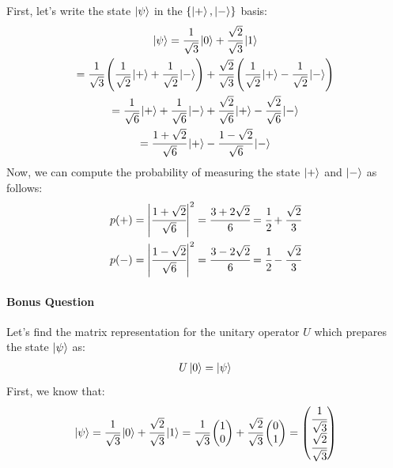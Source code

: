 \documentclass[12pt]{article}
\begin{document}
\begin{itemize}
First, let's write the state $\ket \psi$ in the $\{\ket +, \ket -\}$ basis:
\begin{gather*}
    \ket \psi = \cfrac{1}{\sqrt{3}} \ket 0 + \cfrac{\sqrt{2}}{\sqrt{3}} \ket 1 \\
    = \cfrac{1}{\sqrt{3}} \left(\cfrac{1}{\sqrt{2}}\ket + + \cfrac{1}{\sqrt{2}}\ket -\right) + 
    \cfrac{\sqrt{2}}{\sqrt{3}} \left(\cfrac{1}{\sqrt{2}} \ket + - \cfrac{1}{\sqrt{2}} \ket -\right) \\
    = \cfrac{1}{\sqrt{6}} \ket + + \cfrac{1}{\sqrt{6}} \ket - + 
    \cfrac{\sqrt{2}}{\sqrt{6}} \ket + - \cfrac{\sqrt{2}}{\sqrt{6}} \ket - \\
    = \cfrac{1+\sqrt{2}}{\sqrt{6}} \ket + - \cfrac{1-\sqrt{2}}{\sqrt{6}} \ket -
\end{gather*}
Now, we can compute the probability of measuring the state $\ket +$ and $\ket -$ as follows:
\begin{gather*}
    p(+) = \abs{\cfrac{1+\sqrt{2}}{\sqrt{6}}}^2 = \cfrac{3+2\sqrt{2}}{6} = \cfrac{1}{2} + \cfrac{\sqrt{2}}{3} \\
    p(-) = \abs{\cfrac{1-\sqrt{2}}{\sqrt{6}}}^2 = \cfrac{3-2\sqrt{2}}{6} = \cfrac{1}{2} - \cfrac{\sqrt{2}}{3}
\end{gather*}

\paragraph{Bonus Question}
Let's find the matrix representation for the unitary operator $U$ which prepares the state
$\ket \psi$ as:
\begin{gather*}
    U \ket 0 = \ket \psi
\end{gather*}
First, we know that:
\begin{gather*}
    \ket \psi = \cfrac{1}{\sqrt{3}} \ket 0 + \cfrac{\sqrt{2}}{\sqrt{3}} \ket 1 
    =
    \cfrac{1}{\sqrt{3}} 
    \begin{pmatrix}
        1 \\ 0
    \end{pmatrix}
    +
    \cfrac{\sqrt{2}}{\sqrt{3}}
    \begin{pmatrix}
        0 \\ 1
    \end{pmatrix}
    =
    \begin{pmatrix}
        \cfrac{1}{\sqrt{3}} \\ \cfrac{\sqrt{2}}{\sqrt{3}}
    \end{pmatrix}
\end{gather*}


\end{itemize}
\end{document}
